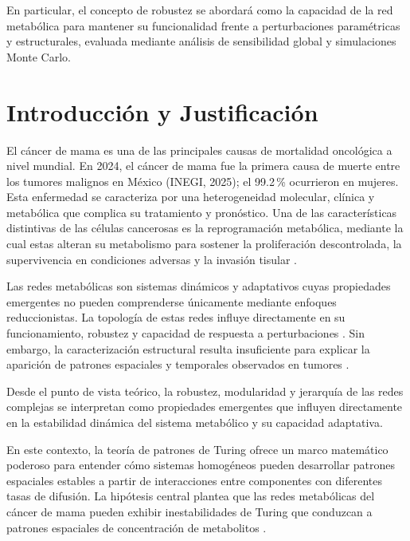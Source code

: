 \documentclass[12pt,spanish]{article}
\begin{document}
	En particular, el concepto de robustez se abordará como la capacidad de la red metabólica para mantener su funcionalidad frente a perturbaciones paramétricas y estructurales, evaluada mediante análisis de sensibilidad global y simulaciones Monte Carlo.
	
	\section{Introducción y Justificación}
	
	El cáncer de mama es una de las principales causas de mortalidad oncológica a nivel mundial. En 2024, el cáncer de mama fue la primera causa de muerte entre los tumores malignos en México (INEGI, 2025); el 99.2\,\% ocurrieron en mujeres. Esta enfermedad se caracteriza por una heterogeneidad molecular, clínica y metabólica que complica su tratamiento y pronóstico. Una de las características distintivas de las células cancerosas es la reprogramación metabólica, mediante la cual estas alteran su metabolismo para sostener la proliferación descontrolada, la supervivencia en condiciones adversas y la invasión tisular \cite{Hanahan2011}.
	
	Las redes metabólicas son sistemas dinámicos y adaptativos cuyas propiedades emergentes no pueden comprenderse únicamente mediante enfoques reduccionistas. La topología de estas redes influye directamente en su funcionamiento, robustez y capacidad de respuesta a perturbaciones \cite{Barabasi2004}. Sin embargo, la caracterización estructural resulta insuficiente para explicar la aparición de patrones espaciales y temporales observados en tumores \cite{Gatenby2004,Zhang2017}.
	
	Desde el punto de vista teórico, la robustez, modularidad y jerarquía de las redes complejas se interpretan como propiedades emergentes que influyen directamente en la estabilidad dinámica del sistema metabólico y su capacidad adaptativa.
	
	En este contexto, la teoría de patrones de Turing ofrece un marco matemático poderoso para entender cómo sistemas homogéneos pueden desarrollar patrones espaciales estables a partir de interacciones entre componentes con diferentes tasas de difusión. La hipótesis central plantea que las redes metabólicas del cáncer de mama pueden exhibir inestabilidades de Turing que conduzcan a patrones espaciales de concentración de metabolitos \cite{Brennan2025,Turing1990}.
	
\end{document}
